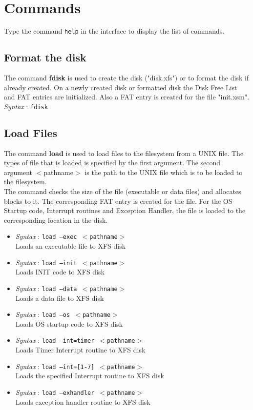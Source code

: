 \documentclass[11pt]{report}
\begin{document}
\section{Commands}
Type the command \texttt{help} in the interface to display the list of commands.

 
\subsection{Format the disk}
The command \textbf{fdisk} is used to create the disk ("disk.xfs") or to format the disk if already created. On a newly created disk or formatted disk the Disk Free List and FAT entries are initialized. Also a FAT entry is created for the file "init.xsm". \\
\textit{Syntax} : \texttt{fdisk}

\subsection{Load Files}
The command \textbf{load} is used to load files to the filesystem from a UNIX file. The types of file that is loaded is specified by the first argument. The second argument $<$pathname$>$ is the path to the UNIX file which is to be loaded to the filesystem. \\
The command checks the size of the file (executable or data files) and allocates blocks to it. The corresponding FAT entry is created for the file. For the OS Startup code, Interrupt routines and Exception Handler, the file is loaded to the corresponding location in the disk.
\begin{itemize}
	\item \textit{Syntax} : \texttt{load --exec  $<$pathname$>$}  \\
	 Loads an executable file to XFS disk 
	\item \textit{Syntax} : \texttt{load --init  $<$pathname$>$}  \\
	 Loads INIT code to XFS disk 
	\item \textit{Syntax} : \texttt{load --data $<$pathname$>$} \\
	 Loads a data file to XFS disk 
	\item \textit{Syntax} : \texttt{load --os  $<$pathname$>$} \\
	 Loads OS startup code to XFS disk 
	\item \textit{Syntax} : \texttt{load --int=timer $<$pathname$>$}\\
	 Loads Timer Interrupt routine to XFS disk 
	\item \textit{Syntax} : \texttt{load --int=[1-7] $<$pathname$>$}\\
	 Loads the specified Interrupt routine to XFS disk 
	\item \textit{Syntax} : \texttt{load --exhandler $<$pathname$>$}  \\
	 Loads exception handler routine to XFS disk 
	 
\end{itemize}
\end{document}

